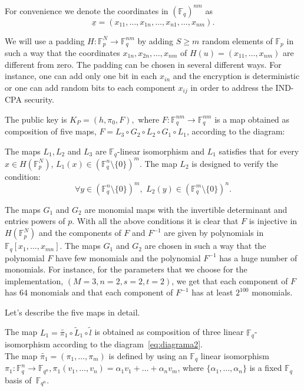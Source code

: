 \documentclass[12pt,a4paper]{amsart}
\theoremstyle{remark}
\theoremstyle{definition}
\newcommand\gfq{\mathbb{F}_q}
\begin{document}
For convenience we denote the coordinates in  $(\gfq)^{nm}$ as 
\[
\underline{x}=(x_{11},\ldots,x_{1n},\ldots, x_{n1},\ldots,  x_{nm}).
\] 


We will use  a padding $H:\mathbb{F}_p^N\to \mathbb{F}_q^{nm}$ by adding $S\geq m$ random elements of $\mathbb{F}_p $ in such a way 
that the coordinates $x_{1n},x_{2n},\ldots, x_{nm}$ of $H(u)=(x_{11},\ldots ,x_{nm})$  
are different from zero. The padding can be chosen in several different ways. For instance, one can add only one bit in each $x_{in}$
and the encryption is deterministic or one can add random bits to each component $x_{ij}$ in order to address the IND-CPA security.   

\newpage


The public key is $K_P=(h, \pi_0,F),$  where $F: \mathbb{F}_	q^{nm}\to \mathbb{F}_q^{nm}$ 
is a map obtained as  composition of five maps, $F=L_3 \circ G_2 \circ L_2 \circ G_1 \circ L_1$, 
according to the diagram:
\begin{center}

\end{center}

The maps $L_1, L_2$ and $L_3$ are $\mathbb{F}_q$-linear isomorphism and 
$L_1$ satisfies that for every $x\in H(\mathbb{F}_p^N )$, $L_1(x)\in(\mathbb{F}_q^n
\setminus \{0\})^m$. The map $L_2$ is designed to verify the condition:
$$
\forall y\in (\mathbb{F}_q^n\setminus \{0\})^m, \,\, L_2(y) 
\in (\mathbb{F}_q^m\setminus \{0\})^n.
$$

The maps $G_1$ and $G_2$ are monomial maps with the invertible determinant and entries  
powers of $p.$  With all the above conditions it is clear that $F$ is injective in $H(\mathbb{F}_p^N)$ 
and the components of $F$ and $F^{-1}$ are  given by polynomials in $\mathbb{F}_q [x_1,\ldots, x_{mn}]$. 
The maps $G_1$ and $G_2$ are chosen in such a way that the polynomial $F$ 
have few monomials and the polynomial $F^{-1}$ has a huge number of monomials. 
For instance, for the parameters that we choose for the implementation, $(M=3, n=2, s=2, t=2)$, 
we get that each component of $F$ has $64$ monomials and that each component of $F^{-1}$ 
has at least $2^{100}$ monomials.

Let's  describe the five maps in detail. 

The map $L_1=\tilde{\pi_1}\circ \tilde{L}_1\circ \tilde{ l} $  
is obtained as composition of three linear $\mathbb{F}_q$-isomorphism  according to the diagram~\eqref{eq:diagrama2}.
\begin{equation}
\label{eq:diagrama2}

\end{equation}
The map $\tilde{\pi_1}=(\pi_1,\ldots,\pi_m)$ is defined by using an 
$\mathbb{F}_q$ linear isomorphism 
$\pi_1: \mathbb{F}_q^n \to \mathbb{F}_{q^n}, \pi_1(v_1, \ldots, v_n)=\alpha_1 v_1+ \ldots+\alpha_n v_m$,
where  $\{ \alpha_1,\ldots,\alpha_n\}$ is a fixed $\mathbb{F}_q$  basis of~$\mathbb{F}_{q^n}.$
\end{document}
